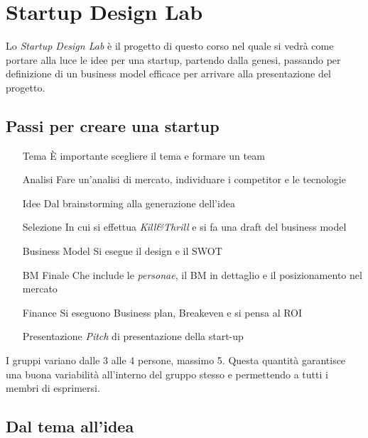 \chapter{Startup Design Lab}

Lo \emph{Startup Design Lab} è il progetto di questo corso nel quale si vedrà
come portare alla luce le idee per una startup, partendo dalla genesi, passando
per definizione di un business model efficace per arrivare alla presentazione
del progetto.

\section{Passi per creare una startup}

\begin{itemize}
 \item[Tema] È importante scegliere il tema e formare un team
 \item[Analisi] Fare un'analisi di mercato, individuare i competitor e le
tecnologie
 \item[Idee] Dal brainstorming alla generazione dell'idea
 \item[Selezione] In cui si effettua \textit{Kill\&Thrill} e si fa una draft
del business model
 \item[Business Model] Si esegue il design e il SWOT
 \item[BM Finale] Che include le \textit{personae}, il BM in
dettaglio e il posizionamento nel mercato
 \item[Finance] Si eseguono Business plan, Breakeven e si pensa al ROI
 \item[Presentazione] \textit{Pitch} di presentazione della start-up
\end{itemize}

I gruppi variano dalle 3 alle 4 persone, massimo 5. Questa quantità garantisce
una buona variabilità all'interno del gruppo stesso e permettendo a tutti i
membri di esprimersi.

\section{Dal tema all'idea}

